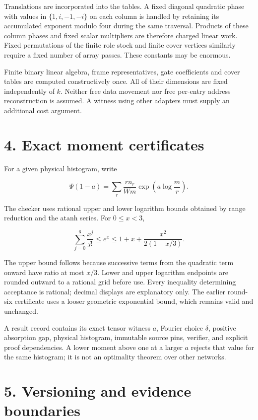 \documentclass[
  11pt,
]{article}
\begin{document}
Translations are incorporated into the tables. A fixed diagonal
quadratic phase with values in \(\{1,i,-1,-i\}\) on each column is
handled by retaining its accumulated exponent modulo four during the
same traversal. Products of these column phases and fixed scalar
multipliers are therefore charged linear work. Fixed permutations of the
finite role stock and finite cover vertices similarly require a fixed
number of array passes. These constants may be enormous.

Finite binary linear algebra, frame representatives, gate coefficients
and cover tables are computed constructively once. All of their
dimensions are fixed independently of \(k\). Neither free data movement
nor free per-entry address reconstruction is assumed. A witness using
other adapters must supply an additional cost argument.

\section{4. Exact moment certificates}\label{exact-moment-certificates}

For a given physical histogram, write

\[
\Psi(1-a)=\sum_r\frac{rn_r}{Wm}
\exp\!\left(a\log\frac mr\right).
\]

The checker uses rational upper and lower logarithm bounds obtained by
range reduction and the atanh series. For \(0\le x<3\),

\[
\sum_{j=0}^{6}\frac{x^j}{j!}\le e^x
\le1+x+\frac{x^2}{2(1-x/3)}.
\tag{4.1}
\]

The upper bound follows because successive terms from the quadratic term
onward have ratio at most \(x/3\). Lower and upper logarithm endpoints
are rounded outward to a rational grid before use. Every inequality
determining acceptance is rational; decimal displays are explanatory
only. The earlier round-six certificate uses a looser geometric
exponential bound, which remains valid and unchanged.

A result record contains its exact tensor witness \(a\), Fourier choice
\(\delta\), positive absorption gap, physical histogram, immutable
source pins, verifier, and explicit proof dependencies. A lower moment
above one at a larger \(a\) rejects that value for the same histogram;
it is not an optimality theorem over other networks.

\section{5. Versioning and evidence
boundaries}\label{versioning-and-evidence-boundaries}
\end{document}
